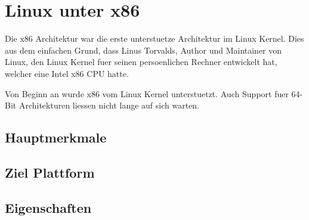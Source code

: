 \chapter{Linux unter x86}
\label{cha:Linux_x86}

Die x86 Architektur war die erste unterstuetze Architektur im Linux Kernel. Dies aus dem einfachen Grund, dass Linus Torvalds, Author und Maintainer von Linux, den Linux Kernel fuer seinen persoenlichen Rechner entwickelt hat, welcher eine Intel x86 CPU hatte.

Von Beginn an wurde x86 vom Linux Kernel unterstuetzt. Auch Support fuer 64-Bit Architekturen liessen nicht lange auf sich warten.

\section{Hauptmerkmale}

\section{Ziel Plattform}

\section{Eigenschaften}
